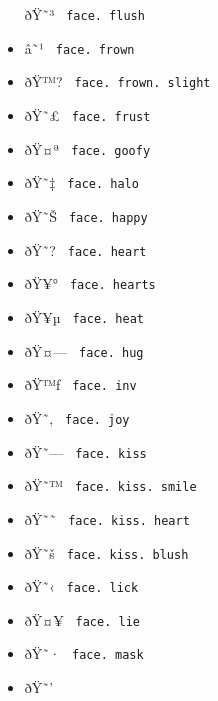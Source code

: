 \begin{itemize}
  \label{symbol-face.flush}{{ ðŸ˜³ }
  \texttt{\ face.\ flush\ }}
\item
  \label{symbol-face.frown}{{ â˜¹ }
  \texttt{\ face.\ frown\ }}
\item
  \label{symbol-face.frown.slight}{{ ðŸ™? }
  \texttt{\ face.\ frown.\ slight\ }}
\item
  \label{symbol-face.frust}{{ ðŸ˜£ }
  \texttt{\ face.\ frust\ }}
\item
  \label{symbol-face.goofy}{{ ðŸ¤ª }
  \texttt{\ face.\ goofy\ }}
\item
  \label{symbol-face.halo}{{ ðŸ˜‡ }
  \texttt{\ face.\ halo\ }}
\item
  \label{symbol-face.happy}{{ ðŸ˜Š }
  \texttt{\ face.\ happy\ }}
\item
  \label{symbol-face.heart}{{ ðŸ˜? }
  \texttt{\ face.\ heart\ }}
\item
  \label{symbol-face.hearts}{{ ðŸ¥° }
  \texttt{\ face.\ hearts\ }}
\item
  \label{symbol-face.heat}{{ ðŸ¥µ }
  \texttt{\ face.\ heat\ }}
\item
  \label{symbol-face.hug}{{ ðŸ¤--- }
  \texttt{\ face.\ hug\ }}
\item
  \label{symbol-face.inv}{{ ðŸ™ƒ }
  \texttt{\ face.\ inv\ }}
\item
  \label{symbol-face.joy}{{ ðŸ˜‚ }
  \texttt{\ face.\ joy\ }}
\item
  \label{symbol-face.kiss}{{ ðŸ˜--- }
  \texttt{\ face.\ kiss\ }}
\item
  \label{symbol-face.kiss.smile}{{ ðŸ˜™ }
  \texttt{\ face.\ kiss.\ smile\ }}
\item
  \label{symbol-face.kiss.heart}{{ ðŸ˜˜ }
  \texttt{\ face.\ kiss.\ heart\ }}
\item
  \label{symbol-face.kiss.blush}{{ ðŸ˜š }
  \texttt{\ face.\ kiss.\ blush\ }}
\item
  \label{symbol-face.lick}{{ ðŸ˜‹ }
  \texttt{\ face.\ lick\ }}
\item
  \label{symbol-face.lie}{{ ðŸ¤¥ }
  \texttt{\ face.\ lie\ }}
\item
  \label{symbol-face.mask}{{ ðŸ˜· }
  \texttt{\ face.\ mask\ }}
\item
  \label{symbol-face.meh}{{ ðŸ˜' }
}
\end{itemize}
